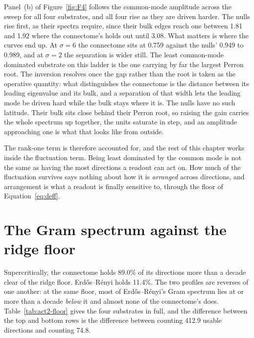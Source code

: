 Panel~(b) of Figure~\ref{fig:F4} follows the common-mode amplitude across the
sweep for all four substrates, and all four rise as they are driven harder. The
nulls rise first, as their spectra require, since their bulk edges reach one
between 1.81 and 1.92 %
where the connectome's holds out until 3.08. %
What matters is where the curves end up. At $\sigma = 6$ the connectome sits at
0.759 %
against the nulls' 0.949 to 0.989, %
and at $\sigma = 2$ the separation is wider still.
The least common-mode dominated substrate on this ladder is the one carrying by
far the largest Perron root. The inversion resolves once the gap rather than the
root is taken as the operative quantity: what distinguishes the connectome is the distance between its leading
eigenvalue and its bulk, and a separation of that width lets the leading mode be
driven hard while the bulk stays where it is. The nulls have no such latitude.
Their bulk sits close behind their Perron root, so raising the gain carries the
whole spectrum up together, the units saturate in step, and an amplitude
approaching one is what that looks like from outside.

The rank-one term is therefore accounted for, and the rest of this chapter works
inside the fluctuation term. Being least dominated by the common mode is not the same as
having the most directions a readout can act on. How much of the fluctuation
survives says nothing about how it is \emph{arranged} across directions, and
arrangement is what a readout is finally sensitive to, through the floor of
Equation~\ref{eq:deff}.








\section{The Gram spectrum against the ridge floor}
\label{sec:act2-floor}
\bigskip


Supercritically, the connectome holds
89.0\% %
of its directions more than a decade clear of the ridge floor. Erdős--Rényi
holds 11.4\%. %
The two profiles are reverses of one another: at the same floor, most of
Erdős--Rényi's Gram spectrum lies at or more than a decade \emph{below} it and
almost none of the connectome's does. Table~\ref{tab:act2-floor} gives the four substrates in
full, and the difference between the top and bottom rows is the difference
between counting 412.9 %
usable directions and counting 74.8. %

